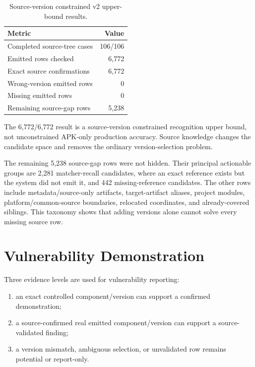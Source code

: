 \begin{table}[H]
\centering
\caption{Source-version constrained v2 upper-bound results.}
\label{tab:pfe-v2-results}
\begin{tabularx}{\textwidth}{Xr}
\toprule
\textbf{Metric} & \textbf{Value}\\
\midrule
Completed source-tree cases & 106/106\\
Emitted rows checked & 6,772\\
Exact source confirmations & 6,772\\
Wrong-version emitted rows & 0\\
Missing emitted rows & 0\\
Remaining source-gap rows & 5,238\\
\bottomrule
\end{tabularx}
\end{table}

The 6,772/6,772 result is a source-version constrained recognition upper bound,
not unconstrained APK-only production accuracy. Source knowledge changes the
candidate space and removes the ordinary version-selection problem.

The remaining 5,238 source-gap rows were not hidden. Their principal
actionable groups are 2,281 matcher-recall candidates, where an exact
reference exists but the system did not emit it, and 442 missing-reference
candidates. The other
rows include metadata/source-only artifacts, target-artifact aliases, project
modules, platform/common-source boundaries, relocated coordinates, and
already-covered siblings. This taxonomy shows that adding versions alone
cannot solve every missing source row.

\section{Vulnerability Demonstration}

Three evidence levels are used for vulnerability reporting:

\begin{enumerate}
  \item an exact controlled component/version can support a confirmed
  demonstration;
  \item a source-confirmed real emitted component/version can support a
  source-validated finding;
  \item a version mismatch, ambiguous selection, or unvalidated row remains
  potential or report-only.
\end{enumerate}

